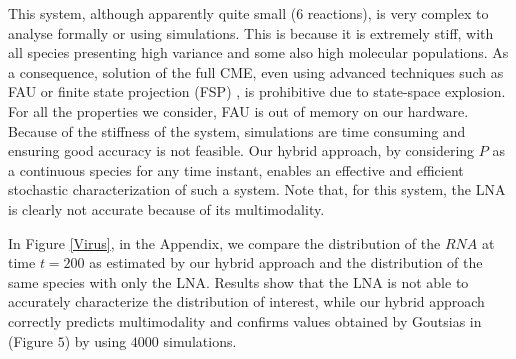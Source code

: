 \documentclass{llncs}
\begin{document}
This system, although apparently quite small ($6$ reactions), is very complex to analyse formally or using simulations. This is because it is extremely stiff, with all species presenting high variance and some also high molecular populations.
As a consequence, solution of the full CME, even using advanced techniques such as FAU or finite state projection (FSP) \cite{munsky2006finite}, is prohibitive due to state-space explosion. %
For all the properties we consider, FAU is out of memory on our hardware. Because of the stiffness of the system, simulations are time consuming and ensuring good accuracy is not feasible. Our hybrid approach, by considering $P$ as a continuous species for any time instant, enables an effective and efficient stochastic characterization of such a system.
Note that, for this system, the LNA is clearly not accurate because of its multimodality.

In Figure \ref{Virus}, in the Appendix, we compare the distribution of the $RNA$ at time $t=200$ as estimated by our hybrid approach and the distribution of the same species with only the LNA. Results show that the LNA is not able to accurately characterize the distribution of interest, while our hybrid approach correctly predicts multimodality and confirms values obtained by Goutsias in \cite{goutsias2005quasiequilibrium} (Figure $5$) by using $4000$ simulations.
\end{document}
